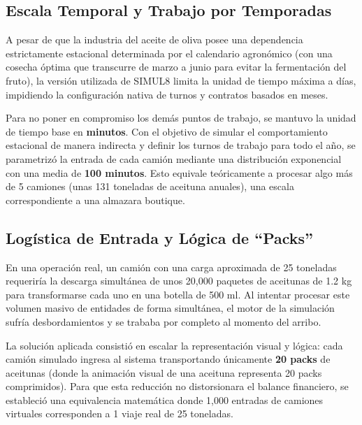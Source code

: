 \documentclass[runningheads]{llncs}
\begin{document}
\subsection{Escala Temporal y Trabajo por Temporadas}
A pesar de que la industria del aceite de oliva posee una dependencia estrictamente estacional determinada por el calendario agronómico (con una cosecha óptima que transcurre de marzo a junio para evitar la fermentación del fruto), la versión utilizada de SIMUL8 limita la unidad de tiempo máxima a días, impidiendo la configuración nativa de turnos y contratos basados en meses. 

Para no poner en compromiso los demás puntos de trabajo, se mantuvo la unidad de tiempo base en \textbf{minutos}. Con el objetivo de simular el comportamiento estacional de manera indirecta y definir los turnos de trabajo para todo el año, se parametrizó la entrada de cada camión mediante una distribución exponencial con una media de \textbf{100 minutos}. Esto equivale teóricamente a procesar algo más de 5 camiones (unas 131 toneladas de aceituna anuales), una escala correspondiente a una almazara boutique.

\subsection{Logística de Entrada y Lógica de ``Packs''}
En una operación real, un camión con una carga aproximada de 25 toneladas requeriría la descarga simultánea de unos 20,000 paquetes de aceitunas de 1.2 kg para transformarse cada uno en una botella de 500 ml. Al intentar procesar este volumen masivo de entidades de forma simultánea, el motor de la simulación sufría desbordamientos y se trababa por completo al momento del arribo.

La solución aplicada consistió en escalar la representación visual y lógica: cada camión simulado ingresa al sistema transportando únicamente \textbf{20 packs} de aceitunas (donde la animación visual de una aceituna representa 20 packs comprimidos). Para que esta reducción no distorsionara el balance financiero, se estableció una equivalencia matemática donde 1,000 entradas de camiones virtuales corresponden a 1 viaje real de 25 toneladas.
\end{document}
